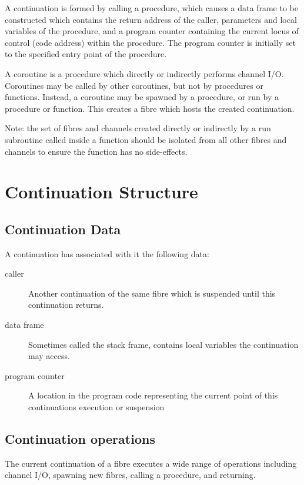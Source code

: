 \documentclass[oneside]{book}
\begin{document}
A continuation is formed by calling a procedure,
which causes a data frame to be constructed which
contains the return address of the caller,
parameters and local variables of the procedure,
and a program counter containing the current
locus of control (code address) within the procedure.
The program counter is initially set to the specified
entry point of the procedure.

A coroutine is a procedure which directly or indirectly
performs channel I/O. Coroutines may be called by 
other coroutines, but not by procedures or functions.
Instead, a coroutine may be spawned by a procedure,
or run by a procedure or function. This creates a
fibre which hosts the created continuation.

Note: the set of fibres and channels created directly
or indirectly by a run subroutine called inside
a function should be isolated from all other fibres
and channels to ensure the function has no side-effects.



\section{Continuation Structure}
\subsection{Continuation Data}
A continuation has associated with it the following
data:

\begin{description}
\item[caller] Another continuation of the same fibre which is
suspended until this continuation returns.
\item[data frame] Sometimes called the stack frame, contains
local variables the continuation may access.
\item[program counter] A location in the program code representing
the current point of this continuations execution or suspension
\end{description}

\subsection{Continuation operations}
The current continuation of a fibre executes a wide range of
operations including channel I/O, spawning new fibres,
calling a procedure, and returning.
\end{document}
